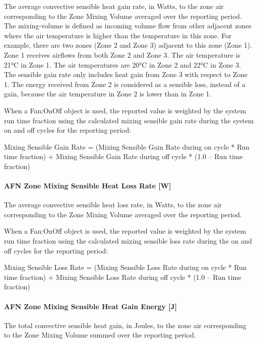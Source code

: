 The average convective sensible heat gain rate, in Watts, to the zone air corresponding to the Zone Mixing Volume averaged over the reporting period. The mixing-volume is defined as incoming volume flow from other adjacent zones where the air temperature is higher than the temperature in this zone. For example, there are two zones (Zone 2 and Zone 3) adjacent to this zone (Zone 1). Zone 1 receives airflows from both Zone 2 and Zone 3. The air temperature is 21°C in Zone 1. The air temperatures are 20°C in Zone 2 and 22°C in Zone 3. The sensible gain rate only includes heat gain from Zone 3 with respect to Zone 1. The energy received from Zone 2 is considered as a sensible loss, instead of a gain, because the air temperature in Zone 2 is lower than in Zone 1.

When a Fan:OnOff object is used, the reported value is weighted by the system run time fraction using the calculated mixing sensible gain rate during the system on and off cycles for the reporting period:

Mixing Sensible Gain Rate = (Mixing Sensible Gain Rate during on cycle * Run time fraction) + Mixing Sensible Gain Rate during off cycle * (1.0 -- Run time fraction)

\paragraph{AFN Zone Mixing Sensible Heat Loss Rate {[}W{]}}\label{afn-zone-mixing-sensible-heat-loss-rate-w}

The average convective sensible heat loss rate, in Watts, to the zone air corresponding to the Zone Mixing Volume averaged over the reporting period.

When a Fan:OnOff object is used, the reported value is weighted by the system run time fraction using the calculated mixing sensible loss rate during the on and off cycles for the reporting period:

Mixing Sensible Loss Rate = (Mixing Sensible Loss Rate during on cycle * Run time fraction) + Mixing Sensible Loss Rate during off cycle * (1.0 -- Run time fraction)

\paragraph{AFN Zone Mixing Sensible Heat Gain Energy {[}J{]}}\label{afn-zone-mixing-sensible-heat-gain-energy-j}

The total convective sensible heat gain, in Joules, to the zone air corresponding to the Zone Mixing Volume summed over the reporting period.

